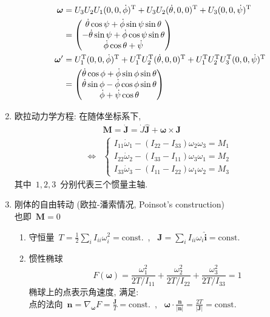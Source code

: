 \documentclass[11pt,a4paper]{article}%
\renewcommand{\[}{~$\displaystyle}
\renewcommand{\]}{$~}%
\begin{document}
\begin{enumerate}
	 \begin{align*}
	  \bm\omega &= U_3U_2U_1 (0,0,\dot\phi)^{\mathrm T} + U_3U_2(\dot\theta,0,0)^{\mathrm T} + U_3(0,0,\dot\psi)^{\mathrm T} \\
	   &= \begin{pmatrix}\dot \theta\cos\psi + \dot\phi\sin\psi\sin\theta \\ -\dot\theta\sin\psi + \dot\phi\cos\psi\sin\theta \\ \dot\phi\cos\theta + \dot\psi\end{pmatrix} \\
	   \bm\omega' &= U_1^{\mathrm T} (0,0,\dot\phi)^{\mathrm T} + U_1^{\mathrm T} U_2^{\mathrm T}(\dot\theta,0,0)^{\mathrm T} + U_1^{\mathrm T} U_2^{\mathrm T} U_3^{\mathrm T}(0,0,\dot\psi)^{\mathrm T} \\
	   &= \begin{pmatrix}\dot \theta\cos\phi + \dot\phi\sin\phi\sin\theta \\ \dot\theta\sin\phi - \dot\phi\cos\phi\sin\theta \\ \dot\phi + \dot\psi\cos\theta\end{pmatrix}
	 \end{align*}
	 \item 欧拉动力学方程: 在随体坐标系下, 
	 \begin{align*}
	 &\bm M = \dot {\bm J} = \dot J \hat{\bm J} + \bm\omega\times \bm J \\
	 \Leftrightarrow&\left\{\begin{aligned}
	   I_{11} \dot\omega_1 - (I_{22} - I_{33})\omega_2\omega_3 = M_1 \\
	   I_{22} \dot \omega _2 - (I_{33} - I_{11})\omega_3\omega_1 =M_2 \\
	   I_{33} \dot \omega_3 - (I_{11}-I_{22})\omega_1\omega_2 = M_3	 
	   \end{aligned}\right.
	 \end{align*}
	 其中\[1,2,3\]分别代表三个惯量主轴. 
	 \item 刚体的自由转动 (欧拉-潘索情况, Poinsot's construction) \\
	 也即\[\bm M = 0\]
	 \begin{enumerate}
	  \item 守恒量\[T = \frac 12 \sum_i I_{ii}\omega_i^2 = \mbox{const.}\], \[\bm J = \sum_i I_{ii}\omega_i \hat{\bm i} = \mbox{const.}\]
	  \item 惯性椭球
	  $$F(\bm \omega) = \frac{\omega_1^2}{2T/I_{11}} + \frac{\omega_2^2}{2T/I_{22}} + \frac{\omega_3^2}{2T/I_{33}} = 1$$
	  椭球上的点表示角速度, 满足:\\
	  点的法向\[\bm n = \nabla_{\bm \omega}F = \frac{\bm J}{T} = \mbox{const.}\], \[\bm\omega\cdot\frac{\bm n}{|\bm n|} = \frac{2T}{|\bm J|} =\mbox{const.}\]\\

\end{enumerate}
\end{enumerate}
\end{document}
